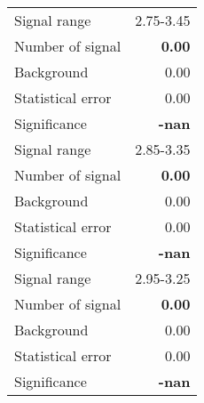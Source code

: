  {\large{
 \begin{tabular}{||l r||}
 \hline
 \hline
Signal range &      2.75-3.45 \\
Number of signal &  \textbf{   0.00} \\
Background &           0.00 \\
Statistical error &    0.00 \\
Significance &      \textbf{   -nan} \\
 \hline
Signal range &      2.85-3.35 \\
Number of signal &  \textbf{   0.00} \\
Background &           0.00 \\
Statistical error &    0.00 \\
Significance &      \textbf{   -nan} \\
 \hline
Signal range &      2.95-3.25 \\
Number of signal &  \textbf{   0.00} \\
Background &           0.00 \\
Statistical error &    0.00 \\
Significance &      \textbf{   -nan} \\
 \hline
 \hline
 \end{tabular}
 }}
 \endinput
